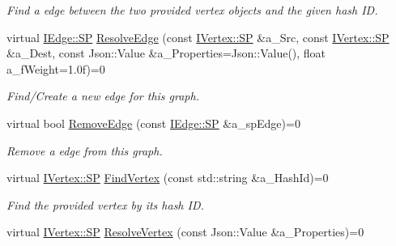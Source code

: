 \begin{DoxyCompactItemize}
\begin{DoxyCompactList}\small\item\em Find a edge between the two provided vertex objects and the given hash ID. \end{DoxyCompactList}\item 
\mbox{\label{class_i_graph_a577e42dd5a961f1404e697dbf6bf3218}} 
virtual \hyperlink{class_i_graph_1_1_i_edge_adfae3ec3e377543685a06b9c5d5a776a}{I\+Edge\+::\+SP} \hyperlink{class_i_graph_a577e42dd5a961f1404e697dbf6bf3218}{Resolve\+Edge} (const \hyperlink{class_i_graph_1_1_i_vertex_af72b9df91f110bc7824c608c10cc819c}{I\+Vertex\+::\+SP} \&a\+\_\+\+Src, const \hyperlink{class_i_graph_1_1_i_vertex_af72b9df91f110bc7824c608c10cc819c}{I\+Vertex\+::\+SP} \&a\+\_\+\+Dest, const Json\+::\+Value \&a\+\_\+\+Properties=Json\+::\+Value(), float a\+\_\+f\+Weight=1.\+0f)=0
\begin{DoxyCompactList}\small\item\em Find/\+Create a new edge for this graph. \end{DoxyCompactList}\item 
\mbox{\label{class_i_graph_aa458c163ec5e732bad303862e10fe450}} 
virtual bool \hyperlink{class_i_graph_aa458c163ec5e732bad303862e10fe450}{Remove\+Edge} (const \hyperlink{class_i_graph_1_1_i_edge_adfae3ec3e377543685a06b9c5d5a776a}{I\+Edge\+::\+SP} \&a\+\_\+sp\+Edge)=0
\begin{DoxyCompactList}\small\item\em Remove a edge from this graph. \end{DoxyCompactList}\item 
\mbox{\label{class_i_graph_a45f84405e490c58477325fce0a77ff48}} 
virtual \hyperlink{class_i_graph_1_1_i_vertex_af72b9df91f110bc7824c608c10cc819c}{I\+Vertex\+::\+SP} \hyperlink{class_i_graph_a45f84405e490c58477325fce0a77ff48}{Find\+Vertex} (const std\+::string \&a\+\_\+\+Hash\+Id)=0
\begin{DoxyCompactList}\small\item\em Find the provided vertex by it\textquotesingle{}s hash ID. \end{DoxyCompactList}\item 
\mbox{\label{class_i_graph_add272797f973bf9095cc9c84f9481976}} 
virtual \hyperlink{class_i_graph_1_1_i_vertex_af72b9df91f110bc7824c608c10cc819c}{I\+Vertex\+::\+SP} \hyperlink{class_i_graph_add272797f973bf9095cc9c84f9481976}{Resolve\+Vertex} (const Json\+::\+Value \&a\+\_\+\+Properties)=0

\end{DoxyCompactItemize}
